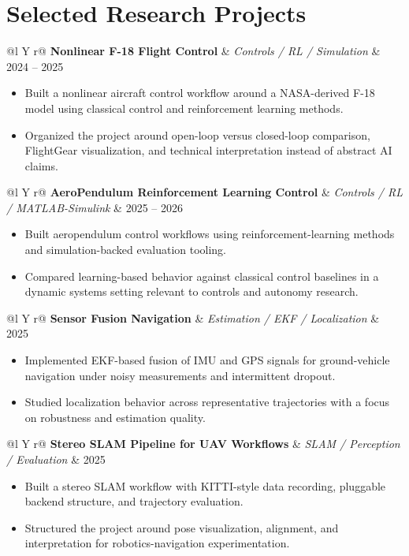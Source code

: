 \documentclass[10pt,letterpaper]{article}
\makeatletter
\newenvironment{project}[3]
{
\begin{tabularx}{\textwidth}{@{}l Y r@{}}
\textbf{#1} & \textit{#2} & #3
\end{tabularx}
\vspace{-0.45em}
\begin{itemize}[leftmargin=1.15em, itemsep=0.14em, topsep=0.15em]
}
{
\end{itemize}
\vspace{0.05em}
}
\makeatother
\begin{document}
\section{Selected Research Projects}

\begin{project}
{Nonlinear F-18 Flight Control}
{Controls / RL / Simulation}
{2024 -- 2025}
    \item Built a nonlinear aircraft control workflow around a NASA-derived F-18 model using classical control and reinforcement learning methods.
    \item Organized the project around open-loop versus closed-loop comparison, FlightGear visualization, and technical interpretation instead of abstract AI claims.
\end{project}

\begin{project}
{AeroPendulum Reinforcement Learning Control}
{Controls / RL / MATLAB-Simulink}
{2025 -- 2026}
    \item Built aeropendulum control workflows using reinforcement-learning methods and simulation-backed evaluation tooling.
    \item Compared learning-based behavior against classical control baselines in a dynamic systems setting relevant to controls and autonomy research.
\end{project}

\begin{project}
{Sensor Fusion Navigation}
{Estimation / EKF / Localization}
{2025}
    \item Implemented EKF-based fusion of IMU and GPS signals for ground-vehicle navigation under noisy measurements and intermittent dropout.
    \item Studied localization behavior across representative trajectories with a focus on robustness and estimation quality.
\end{project}

\begin{project}
{Stereo SLAM Pipeline for UAV Workflows}
{SLAM / Perception / Evaluation}
{2025}
    \item Built a stereo SLAM workflow with KITTI-style data recording, pluggable backend structure, and trajectory evaluation.
    \item Structured the project around pose visualization, alignment, and interpretation for robotics-navigation experimentation.
\end{project}
\end{document}
